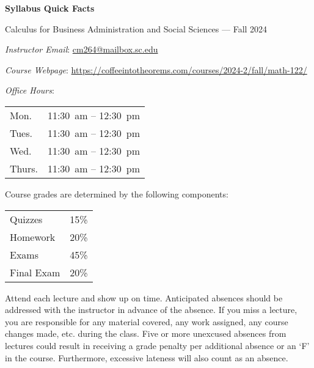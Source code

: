 \documentclass[11pt,letterpaper]{article}
\begin{document}
\begin{center} 
\bfseries
\color{scred}
\LARGE Syllabus Quick Facts \par\vspace{0.2\baselineskip}
\Large Calculus for Business Administration and Social Sciences --- Fall 2024
\end{center} \pspace


\hspace{0.53cm} {\itshape Instructor Email}: \href{mailto:cm264@mailbox.sc.edu}{cm264@mailbox.sc.edu} \par
\hspace{0.53cm} {\itshape Course Webpage}: \href{https://coffeeintotheorems.com/courses/2024-2/fall/math-122/}{https://coffeeintotheorems.com/courses/2024-2/fall/math-122/} \par
\hspace{0.53cm} {\itshape Office Hours}: 	\par \vspace{-0.3cm}
	\begin{table}[!ht]
	\centering
	\begin{tabular}{l || l}
	Mon. & 11:30~am -- 12:30~pm \\
	Tues. & 11:30~am -- 12:30~pm \\
	Wed. & 11:30~am -- 12:30~pm \\
	Thurs. & 11:30~am -- 12:30~pm
	\end{tabular}
	\end{table}


Course grades are determined by the following components: \par \vspace{-0.3cm}
	\begin{table}[!ht]
        \begin{tabular}{lr}
	Quizzes & 15\% \\
        Homework & 20\% \\
        Exams & 45\% \\
        Final Exam & 20\% \\
        \end{tabular} 
        \end{table}


Attend each lecture and show up on time. Anticipated absences should be addressed with the instructor in advance of the absence. If you miss a lecture, you are responsible for any material covered, any work assigned, any course changes made, etc. during the class. Five or more unexcused absences from lectures could result in receiving a grade penalty per additional absence or an `F' in the course. Furthermore, excessive lateness will also count as an absence. \pspace
\end{document}
